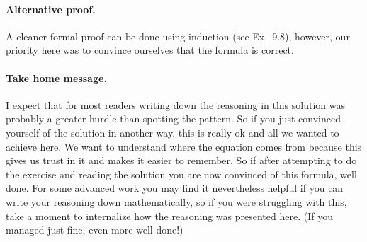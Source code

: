 \paragraph{Alternative proof.}A cleaner formal proof can be done using induction (see Ex.~9.8), however, our priority here was to convince ourselves that the formula is correct.  

\paragraph{Take home message.}I expect that for most readers writing down the reasoning in this solution was probably a greater hurdle than spotting the pattern. So if you just convinced yourself of the solution in another way, this is really ok and all we wanted to achieve here. We want to understand where the equation comes from because this gives us trust in it and makes it easier to remember. So if after attempting to do the exercise and reading the solution you are now convinced of this formula, well done. For some advanced work you may find it nevertheless helpful if you can write your reasoning down mathematically, so if you were struggling with this, take a moment to internalize how the reasoning was presented here. (If you managed just fine, even more well done!) 
